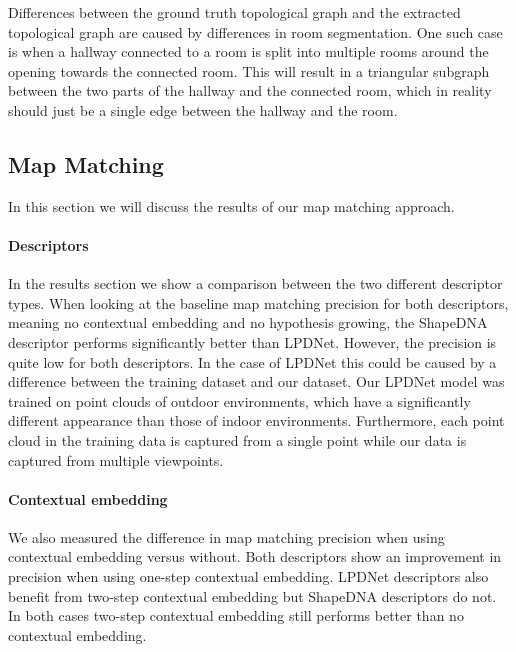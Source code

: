 Differences between the ground truth topological graph and the extracted topological graph are caused by differences in room segmentation. One such case is when a hallway connected to a room is split into multiple rooms around the opening towards the connected room. This will result in a triangular subgraph between the two parts of the hallway and the connected room, which in reality should just be a single edge between the hallway and the room. 

\pagebreak



\subsection{Map Matching}
In this section we will discuss the results of our map matching approach. 

\paragraph{Descriptors}
In the results section we show a comparison between the two different descriptor types. When looking at the baseline map matching precision for both descriptors, meaning no contextual embedding and no hypothesis growing, the ShapeDNA descriptor performs significantly better than LPDNet. However, the precision is quite low for both descriptors. In the case of LPDNet this could be caused by a difference between the training dataset and our dataset. Our LPDNet model was trained on point clouds of outdoor environments, which have a significantly different appearance than those of indoor environments. Furthermore, each point cloud in the training data is captured from a single point while our data is captured from multiple viewpoints.

\paragraph{Contextual embedding}
We also measured the difference in map matching precision when using contextual embedding versus without. Both descriptors show an improvement in precision when using one-step contextual embedding. LPDNet descriptors also benefit from two-step contextual embedding but ShapeDNA descriptors do not. In both cases two-step contextual embedding still performs better than no contextual embedding.

